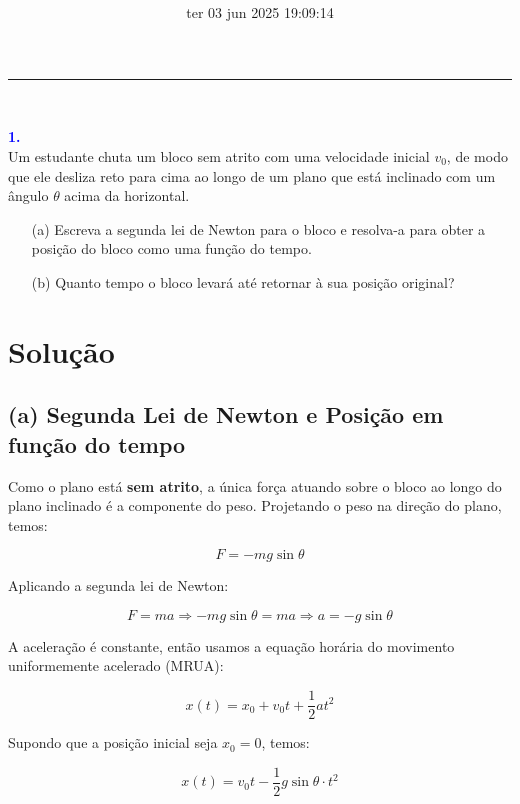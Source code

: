 \documentclass[a4paper,12pt]{article}
\title{ \textbf{\large } }
\author{}
\date{ter 03 jun 2025 19:09:14}
\begin{document}
\maketitle
\noindent\rule{\linewidth}{0.4pt}\\

\justifying

\begin{flushleft}
\textbf{\textcolor{blue}{\Large \textbf{1.}}}\\
\noindent
Um estudante chuta um bloco sem atrito com uma velocidade inicial \(v_0\), de modo que ele desliza reto para cima ao longo de um plano que está inclinado com um ângulo \(\theta\) acima da horizontal. 

\begin{itemize}
    \item[(a)] Escreva a segunda lei de Newton para o bloco e resolva-a para obter a posição do bloco como uma função do tempo.
    \item[(b)] Quanto tempo o bloco levará até retornar à sua posição original?
\end{itemize}

\vspace{0.5cm}
\section*{Solução}

\subsection*{(a) \colorbox{yellow!20}{Segunda Lei de Newton e Posição em função do tempo}}

Como o plano está \textbf{sem atrito}, a única força atuando sobre o bloco ao longo do plano inclinado é a componente do peso. Projetando o peso na direção do plano, temos:

\[
F = -mg\sin\theta
\]

Aplicando a segunda lei de Newton:

\[
F = ma \Rightarrow -mg\sin\theta = ma \Rightarrow a = -g\sin\theta
\]

A aceleração é constante, então usamos a equação horária do movimento uniformemente acelerado (MRUA):

\[
x(t) = x_0 + v_0 t + \frac{1}{2} a t^2
\]

Supondo que a posição inicial seja \(x_0 = 0\), temos:

\[
x(t) = v_0 t - \frac{1}{2} g \sin\theta \cdot t^2
\]


\end{flushleft}
\end{document}
